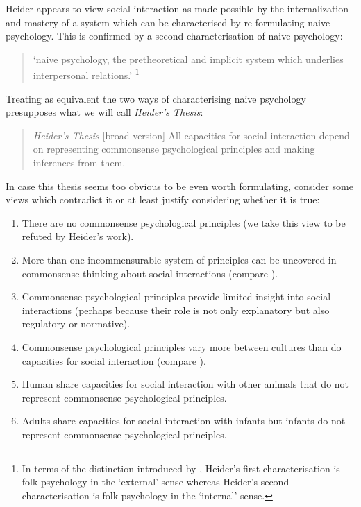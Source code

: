 \documentclass[12pt,\papersize]{extarticle}
\newif\iffoot
\let\origfootnote\footnote
\renewcommand{\footnote}[1]{\foottrue\origfootnote{#1}\footfalse}
\begin{document}
Heider appears to view social interaction as made possible by the internalization and mastery of a system which can be characterised by re-formulating naive psychology. This is confirmed by a second characterisation of naive psychology:

\begin{quote}
`naive psychology, the pretheoretical and implicit system which underlies interpersonal relations.' \citep[p.~58]{heider:1958_psychology}\footnote{In terms of the distinction introduced by \citet{stich:1994_whata}, Heider's first characterisation is folk psychology in the `external' sense whereas Heider's second characterisation is folk psychology in the `internal' sense.}
\end{quote}

Treating as equivalent the two ways of characterising naive psychology presupposes what we will call \emph{Heider's Thesis}:

\begin{quote}
\emph{Heider's Thesis} {[}broad version{]} All capacities for social interaction depend on representing commonsense psychological principles and making inferences from them.
\end{quote}

In case this thesis seems too obvious to be even worth formulating, consider some views which contradict it or at least justify considering whether it is true:

\begin{enumerate}
\def\labelenumi{\arabic{enumi}.}
\item
  There are no commonsense psychological principles (we take this view to be refuted by Heider's work).
\item
  More than one incommensurable system of principles can be uncovered in commonsense thinking about social interactions (compare \citealp{stich:1994_whata}).
\item
  Commonsense psychological principles provide limited insight into social interactions (perhaps because their role is not only explanatory but also regulatory \citep{mcgeer:2007_regulative,zawidzki:2013_mindshaping} or normative).
\item
  Commonsense psychological principles vary more between cultures than do capacities for social interaction (compare \citealp{lillard:1998_ethnopsychologies}).
\item
  Human share capacities for social interaction with other animals that do not represent commonsense psychological principles.
\item
  Adults share capacities for social interaction with infants but infants do not represent commonsense psychological principles.
\end{enumerate}
\end{document}
